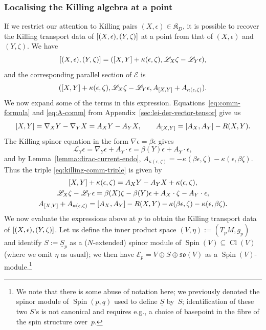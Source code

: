 \documentclass[11pt]{article}
\numberwithin{equation}{section}
\numberwithin{equation}{section}
\newcommand{\fso}{\mathfrak{so}}
\newcommand{\fK}{\mathfrak{K}}
\newcommand{\eE}{\mathscr{E}}
\newcommand{\eL}{\mathscr{L}}
\newcommand{\Sbundle}{\underline{S}}
\newcommand{\1}{\mathbbm{1}}
\DeclareMathOperator{\Spin}{Spin}
\DeclareMathOperator{\Cl}{Cl}
\begin{document}
\subsubsection{Localising the Killing algebra at a point}

If we restrict our attention to Killing pairs $(X,\epsilon)\in\fK_D$, it is possible to recover the Killing transport data of $\comm{(X,\epsilon)}{(Y,\zeta)}$ at a point from that of $(X,\epsilon)$ and $(Y,\zeta)$. We have
\[
	\comm{(X,\epsilon)}{(Y,\zeta)} = \qty(\comm{X}{Y} + \kappa(\epsilon,\zeta),\eL_X\zeta - \eL_Y\epsilon),
\]
and the corresponding parallel section of $\eE$ is
\begin{equation}\label{eq:killing-comm-triple}
	(\comm{X}{Y} + \kappa(\epsilon,\zeta),\eL_X\zeta - \eL_Y\epsilon,A_{\comm{X}{Y}} + A_{\kappa(\epsilon,\zeta)}).
\end{equation}
We now expand some of the terms in this expression. Equations~\eqref{eq:comm-formula} and \eqref{eq:A-comm} from Appendix~\ref{sec:lei-der-vector-tensor} give us
\[
	\comm{X}{Y} = \nabla_X Y - \nabla_Y X = A_X Y - A_Y X,\qquad
	A_{\comm{X}{Y}} = \comm{A_X}{A_Y} - R(X,Y).
\]
The Killing spinor equation in the form $\nabla \epsilon = \beta\epsilon$ gives
\[
	\eL_Y\epsilon = \nabla_Y\epsilon + A_Y\cdot\epsilon = \beta(Y)\epsilon + A_Y\cdot\epsilon,
\]
and by Lemma~\ref{lemma:dirac-current-endo},
$
	A_{\kappa(\epsilon,\zeta)} = - \kappa(\beta\epsilon,\zeta) - \kappa(\epsilon,\beta\zeta)$.
Thus the triple \eqref{eq:killing-comm-triple} is given by
\begin{gather*}
	\comm{X}{Y} + \kappa(\epsilon,\zeta) = A_X Y - A_Y X + \kappa(\epsilon,\zeta),\\
	\eL_X\zeta - \eL_Y\epsilon = \beta(X)\zeta - \beta(Y)\epsilon + A_X\cdot\zeta - A_Y\cdot\epsilon,\\
	A_{\comm{X}{Y}} + A_{\kappa(\epsilon,\zeta)} = \comm{A_X}{A_Y} - R(X,Y) - \kappa(\beta\epsilon,\zeta) - \kappa(\epsilon,\beta\zeta).
\end{gather*}
We now evaluate the expressions above at $p$ to obtain the Killing transport data of $\comm{(X,\epsilon)}{(Y,\zeta)}$. Let us define the inner product space $(V,\eta):=(T_pM,g_p)$ and identify $S:=\Sbundle_p$ as a ($N$-extended) spinor module of $\Spin(V)\subseteq\Cl(V)$ (where we omit $\eta$ as usual); we then have $\eE_p = V\oplus S\oplus\fso(V)$ as a $\Spin(V)$-module.\footnote{We note that there is some abuse of notation here; we previously denoted the spinor module of $\Spin(p,q)$ used to define $\Sbundle$ by~$S$; identification of these two $S$'s is not canonical and requires e.g., a choice of basepoint in the fibre of the spin structure over~$p$.}
\end{document}
